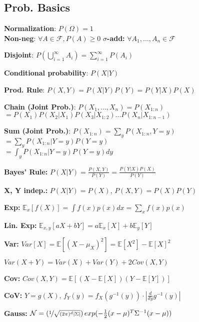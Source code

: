 \subsection*{Prob. Basics} \;
\textbf{Normalization}: \; $P(\Omega) = 1$ \\
\textbf{Non-neg}: \; $\forall A \in \mathcal{F}, P(A) \geq 0$ \;
\textbf{$\sigma$-add:} \; $\forall A_{1},..., A_{n} \in \mathcal{F}$ 

\textbf{Disjoint}: \; $P \left(\bigcup\limits_{i=1}^{\infty} A_{i} \right) = \sum\limits_{i=1}^{\infty}P(A_{i})$

\textbf{Conditional probability}: \; $P(X|Y)$

\textbf{Prod. Rule}: \; $P(X,Y)=P(X|Y)P(Y)=P(Y|X)P(X)$

\textbf{Chain (Joint Prob.)}: \; $P(X_1, ..., X_n) = P(X_{1:n})$ \\
$=P(X_1)P(X_2|X_1)P(X_3|X_{1:2})...P(X_n|X_{1:n-1})$

\textbf{Sum (Joint Prob.)}: \; $P(X_{1:n}) = \sum_y P(X_{1:n}, Y=y)$ \\
\; \; $=\sum_y P(X_{1:n}|Y=y)P(Y=y)$ \\
\; \; $=\int_y P(X_{1:n}|Y=y)P(Y=y)dy$

\vspace*{-1mm}
\textbf{Bayes' Rule:} \; $P(X|Y) = \frac{P(X,Y)}{P(Y)} = \frac{P(Y|X)P(X)}{P(Y)}$

\textbf{X, Y indep.:} \; $P(X|Y) = P(X)$, \;$P(X,Y) = P(X) P(Y)$

\textbf{Exp:} \; $\mathbb{E}_x[f(X)] = \int f(x)p(x)dx = \sum_x f(x)p(x)$

\textbf{Lin. Exp:} \; $\mathbb{E}_{x,y}[aX + bY] = a\mathbb{E}_x[X] + b \mathbb{E}_y[Y]$

\textbf{Var:} \; $Var[X] = \mathbb{E}[(X-\mu_X)^2] = \mathbb{E}[X^2] - \mathbb{E}[X]^2$

$Var(X + Y) = Var(X) + Var(Y) + 2Cov(X,Y)$

\textbf{Cov:} \; $Cov(X, Y) = \mathbb{E}[(X - \mathbb{E}[X])(Y - \mathbb{E}[Y])]$

\textbf{CoV:} \; $Y = g(X)$, $f_Y(y) = f_X(g^{-1}(y)) \cdot |\frac{d}{dy} g^{-1}(y)|$

\vspace*{-0.5mm}
\textbf{Gauss:} \; \mbox{\fontsize{8}{6}\selectfont $\mathcal{N} = \left(\nicefrac{1}{\sqrt{(2\pi)^d |\Sigma|}}\right) exp(-\frac{1}{2}(x-\mu)^T\Sigma^{-1} (x-\mu))$}

